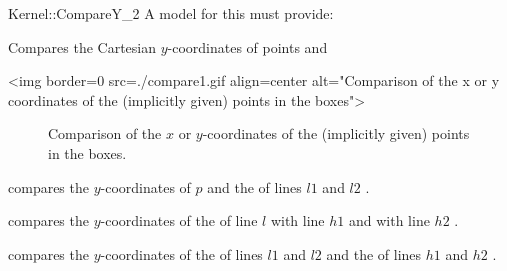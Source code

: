 \begin{ccRefFunctionObjectConcept}{Kernel::CompareY_2}
A model for this must provide:


      {Compares the Cartesian $y$-coordinates of points  and
      }

\begin{ccHtmlOnly}
<img border=0 src=./compare1.gif align=center alt="Comparison of the x 
or y coordinates of the (implicitly given) points in the boxes">
\end{ccHtmlOnly} 

\begin{ccTexOnly}
\begin{figure}[h]
\centerline{}
\caption{Comparison of the $x$ or $y$-coordinates of the (implicitly
given) points in the boxes.\label{fig-compare14}}
\end{figure} 
\end{ccTexOnly} 


        {compares the $y$-coordinates of $p$ and the 
          of lines
         $l1$ and $l2$%
         .}


        {compares the $y$-coordinates of the  of line $l$
         with line $h1$ and with line $h2$%
         .}


        {compares the $y$-coordinates of the  of lines $l1$
         and $l2$ and  the  of lines $h1$ and $h2$ 
         .}


\ccSeeAlso
{} \\

\end{ccRefFunctionObjectConcept}
